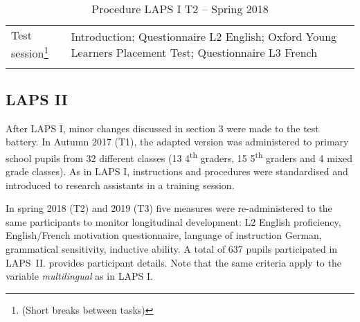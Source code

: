 \documentclass[output=paper]{langsci/langscibook}
\begin{document}
\begin{table}
\begin{tabularx}{\textwidth}{lQ}
\lsptoprule
Test session\footnote{(Short breaks between tasks)} & Introduction; Questionnaire L2 English; Oxford Young Learners Placement Test; Questionnaire L3 French\\
\lspbottomrule
\end{tabularx}
\caption{Procedure LAPS I T2 – Spring 2018\label{tab:02:4}}
\end{table}

 \subsection{LAPS II}


After LAPS I, minor changes discussed in section 3 were made to the test battery. In Autumn 2017 (T1), the adapted version was administered to primary school pupils from 32 different classes (13 4\textsuperscript{th} graders, 15 5\textsuperscript{th} graders and 4 mixed grade classes). As in LAPS I, instructions and procedures were standardised and introduced to research assistants in a training session. 

In spring 2018 (T2) and 2019 (T3) five measures were re-administered to the same participants to monitor longitudinal development: L2 English proficiency, English/French motivation questionnaire, language of instruction German, grammatical sensitivity, inductive ability. A total of 637 pupils participated in LAPS~II.  provides participant details. Note that the same criteria apply to the variable \textit{multilingual} as in LAPS I. 
\end{document}
